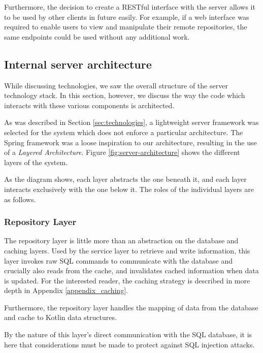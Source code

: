 Furthermore, the decision to create a RESTful interface with the server allows it to be used by other clients in future easily. For example, if a web interface was required to enable users to view and manipulate their remote repositories, the same endpoints could be used without any additional work.

\subsection{Internal server architecture}

While discussing technologies, we saw the overall structure of the server technology stack. In this section, however, we discuss the way the code which interacts with these various components is architected.

As was described in Section \ref{sec:technologies}, a lightweight server framework was selected for the system which does not enforce a particular architecture. The Spring framework was a loose inspiration to our architecture, resulting in the use of a \emph{Layered Architecture}. Figure \ref{fig:server-architecture} shows the different layers of the system.

As the diagram shows, each layer abstracts the one beneath it, and each layer interacts exclusively with the one below it. The roles of the individual layers are as follows.


\subsubsection{Repository Layer}

The repository layer is little more than an abstraction on the database and caching layers. Used by the service layer to retrieve and write information, this layer invokes raw SQL commands to communicate with the database and crucially also reads from the cache, and invalidates cached information when data is updated. For the interested reader, the caching strategy is described in more depth in Appendix \ref{appendix_caching}.

Furthermore, the repository layer handles the mapping of data from the database and cache to Kotlin data structures.

By the nature of this layer's direct communication with the SQL database, it is here that considerations must be made to protect against SQL injection attacks.


